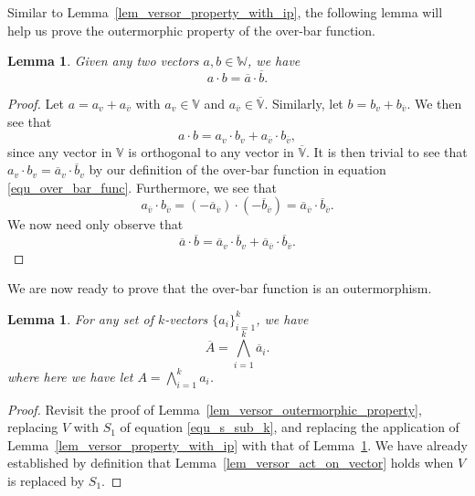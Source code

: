 \documentclass{birkjour}
\newtheorem{lem}[thm]{Lemma}
\theoremstyle{definition}
\theoremstyle{remark}
\numberwithin{equation}{section}
\newcommand{\V}{\mathbb{V}}
\newcommand{\Vb}{\mathbb{\overline{V}}}
\newcommand{\W}{\mathbb{W}}
\begin{document}
Similar to Lemma~\ref{lem_versor_property_with_ip}, the following
lemma will help us prove the outermorphic property of the over-bar function.
\begin{lem}\label{lem_overbar_property_with_ip}
Given any two vectors $a,b\in\W$, we have
\begin{equation}
a\cdot b = \overline{a}\cdot\overline{b}.
\end{equation}
\end{lem}
\begin{proof}
Let $a=a_v+a_{\overline{v}}$ with $a_v\in\V$ and $a_{\overline{v}}\in\Vb$.
Similarly, let $b=b_v+b_{\overline{v}}$.  We then see that
\begin{equation}
a\cdot b = a_v\cdot b_v + a_{\overline{v}}\cdot b_{\overline{v}},
\end{equation}
since any vector in $\V$ is orthogonal to any vector in $\Vb$.
It is then trivial to see that $a_v\cdot b_v=\overline{a}_v\cdot\overline{b}_v$ by
our definition of the over-bar function in equation \eqref{equ_over_bar_func}.
Furthermore, we see that
\begin{equation}
a_{\overline{v}}\cdot b_{\overline{v}}=
(-\overline{a}_{\overline{v}})\cdot(-\overline{b}_{\overline{v}})=
\overline{a}_{\overline{v}}\cdot\overline{b}_{\overline{v}}.
\end{equation}
We now need only observe that
\begin{equation}
\overline{a}\cdot\overline{b}=\overline{a}_v\cdot\overline{b}_v +
\overline{a}_{\overline{v}}\cdot\overline{b}_{\overline{v}}.
\end{equation}
\end{proof}
We are now ready to prove that the over-bar function is an outermorphism.
\begin{lem}\label{lem_overbar_outermorph}
For any set of $k$-vectors $\{a_i\}_{i=1}^k$, we have
\begin{equation}
\overline{A}=\bigwedge_{i=1}^k\overline{a}_i.
\end{equation}
where here we have let $A=\bigwedge_{i=1}^k a_i$.
\end{lem}
\begin{proof}
Revisit the proof of Lemma~\ref{lem_versor_outermorphic_property},
replacing $V$ with $S_1$ of equation \eqref{equ_s_sub_k},
and replacing the application of Lemma~\ref{lem_versor_property_with_ip}
with that of Lemma~\ref{lem_overbar_property_with_ip}.  We have already established
by definition that Lemma~\ref{lem_versor_act_on_vector} holds when $V$ is replaced by $S_1$.
\end{proof}
\end{document}

